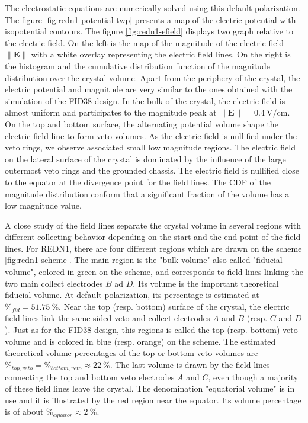 The electrostatic equations are numerically solved using this default polarization. The figure \ref{fig:redn1-potential-twp} presents a map of the electric potential with isopotential contours. The  figure \ref{fig:redn1-efield} displays two graph relative to the electric field. On the left is the map of the magnitude of the electric field $\| \bm{E} \|$ with a white overlay representing the electric field lines. On the right is the histogram and the cumulative distribution function of the magnitude distribution over the crystal volume.
Apart from the periphery of the crystal, the electric potential and magnitude are very similar to the ones obtained with the simulation of the FID38 design. In the bulk of the crystal, the electric field is almost uniform and participates to the magnitude peak at $\| \bm{E} \| = \SI{0.4}{\volt\per\centi\meter}$. 
On the top and bottom surface, the alternating potential volume shape the electric field line to form veto volumes. As the electric field is nullified under the veto rings, we observe associated small low magnitude regions. 
The electric field on the lateral surface of the crystal is dominated by the influence of the large outermost veto rings and the grounded chassis. The electric field is nullified close to the equator at the divergence point for the field lines.
The CDF of the magnitude distribution conform that a significant fraction of the volume has a low magnitude value.

A close study of the field lines separate the crystal volume in several regions with different collecting behavior depending on the start and the end point of the field lines. For REDN1, there are four different regions which are drawn on the scheme \ref{fig:redn1-scheme}. 
The main region is the "bulk volume" also called "fiducial volume", colored in green on the scheme, and corresponds to field lines linking the two main collect electrodes $B$ ad $D$. Its volume is the important theoretical fiducial volume. At default polarization, its percentage is estimated at $\%_{fid}=\SI{51.75}{\percent}$.
Near the top (resp. bottom) surface of the crystal, the electric field lines link the same-sided veto and collect electrodes $A$ and $B$ (resp. $C$ and $D$). Just as for the FID38 design, this regions is called the top (resp. bottom) veto volume and is colored in blue (resp. orange) on the scheme. The estimated theoretical volume percentages of the top or bottom veto volumes are $\%_{top,veto} = \%_{bottom,veto} \approx \SI{22}{\percent}$. 
The last volume is drawn by the field lines connecting the top and bottom veto electrodes $A$ and $C$, even though a majority of these field lines leave the crystal. The denomination "equatorial volume" is in use and it is illustrated by the red region near the equator. Its volume percentage is of about $\%_{equator} \approx \SI{2}{\percent}$.

